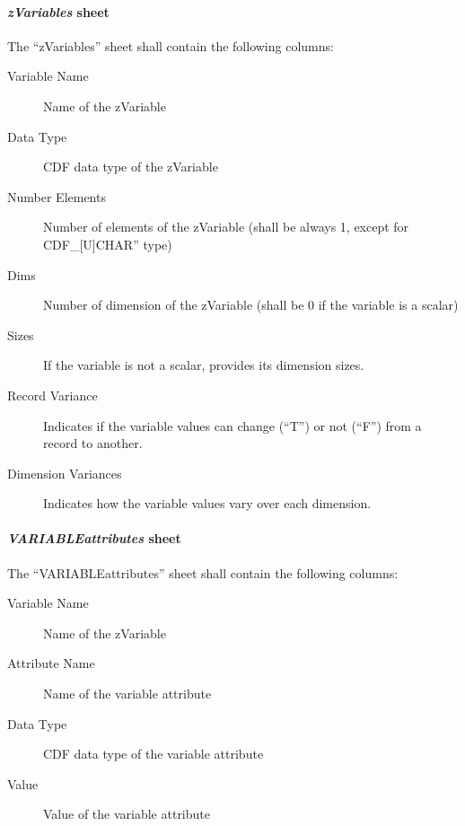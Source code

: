 \documentclass[letterpaper,10pt,english]{sphinxmanual}
\begin{document}
\paragraph{\emph{zVariables} sheet}
\label{cdf:zvariables-sheet}
The ``zVariables'' sheet shall contain the following columns:
\begin{description}
\item[{Variable Name}] \leavevmode
Name of the zVariable

\item[{Data Type}] \leavevmode
CDF data type of the zVariable

\item[{Number Elements}] \leavevmode
Number of elements of the zVariable (shall be always 1, except for CDF\_{[}U{]}CHAR'' type)

\item[{Dims}] \leavevmode
Number of dimension of the zVariable (shall be 0 if the variable is a scalar)

\item[{Sizes}] \leavevmode
If the variable is not a scalar, provides its dimension sizes.

\item[{Record Variance}] \leavevmode
Indicates if the variable values can change (``T'') or not (``F'') from a record to another.

\item[{Dimension Variances}] \leavevmode
Indicates how the variable values vary over each dimension.

\end{description}


\paragraph{\emph{VARIABLEattributes} sheet}
\label{cdf:variableattributes-sheet}
The ``VARIABLEattributes'' sheet shall contain the following columns:
\begin{description}
\item[{Variable Name}] \leavevmode
Name of the zVariable

\item[{Attribute Name}] \leavevmode
Name of the variable attribute

\item[{Data Type}] \leavevmode
CDF data type of the variable attribute

\item[{Value}] \leavevmode
Value of the variable attribute

\end{description}
\end{document}
